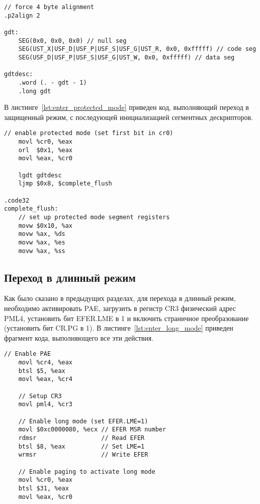 \begin{lstlisting}[language={[x86masm]Assembler},
caption={Объявление GDT и ее дескриптора},label={lst:declare_gdt}]
// force 4 byte alignment
.p2align 2

gdt:
	SEG(0x0, 0x0, 0x0) // null seg
	SEG(UST_X|USF_D|USF_P|USF_S|USF_G|UST_R, 0x0, 0xfffff) // code seg
	SEG(USF_D|USF_P|USF_S|USF_G|UST_W, 0x0, 0xfffff) // data seg

gdtdesc:
	.word (. - gdt - 1)
	.long gdt
\end{lstlisting}

В листинге~\ref{lst:enter_protected_mode} приведен код, выполняющий переход в защищенный режим,
с последующей инициализацией сегментных дескрипторов.
\begin{lstlisting}[language={[x86masm]Assembler},
caption={Переход в защищенный режим},label={lst:enter_protected_mode}]
	// enable protected mode (set first bit in cr0)
	movl %cr0, %eax
	orl  $0x1, %eax
	movl %eax, %cr0

	lgdt gdtdesc
	ljmp $0x8, $complete_flush

.code32
complete_flush:
	// set up protected mode segment registers
	movw $0x10, %ax
	movw %ax, %ds
	movw %ax, %es
	movw %ax, %ss
\end{lstlisting}

\subsection{Переход в длинный режим}
Как было сказано в предыдущих разделах, для перехода в длинный режим, необходимо
активировать PAE, загрузить в регистр CR3 физический адрес PML4, установить бит
EFER.LME в 1 и включить страничное преобразование (установить бит CR.PG в 1). В
листинге~\ref{lst:enter_long_mode} приведен фрагмент кода, выполняющего все эти действия.

\begin{lstlisting}[language={[x86masm]Assembler},
caption={Переход в длинный режим},label={lst:enter_long_mode}]
	// Enable PAE
	movl %cr4, %eax
	btsl $5, %eax
	movl %eax, %cr4

	// Setup CR3
	movl pml4, %cr3

	// Enable long mode (set EFER.LME=1)
	movl $0xc0000080, %ecx // EFER MSR number
	rdmsr                  // Read EFER
	btsl $8, %eax          // Set LME=1
	wrmsr                  // Write EFER

	// Enable paging to activate long mode
	movl %cr0, %eax
	btsl $31, %eax
	movl %eax, %cr0
\end{lstlisting}

